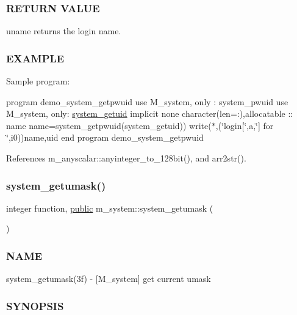 \subsubsection*{R\+E\+T\+U\+RN V\+A\+L\+UE}

uname returns the login name.

\subsubsection*{E\+X\+A\+M\+P\+LE}

Sample program\+:

program demo\+\_\+system\+\_\+getpwuid use M\+\_\+system, only \+: system\+\_\+pwuid use M\+\_\+system, only\+: \hyperlink{interfacem__system_1_1system__getuid}{system\+\_\+getuid} implicit none character(len=\+:),allocatable \+:\+: name name=system\+\_\+getpwuid(system\+\_\+getuid)) write($\ast$,\textquotesingle{}(\char`\"{}login\mbox{[}\char`\"{},a,\char`\"{}\mbox{]} for \char`\"{},i0)\textquotesingle{})name,uid end program demo\+\_\+system\+\_\+getpwuid 

References m\+\_\+anyscalar\+::anyinteger\+\_\+to\+\_\+128bit(), and arr2str().

\mbox{\label{namespacem__system_aa9ca951be39d2ea738d627cf42c00ddd}} 
\subsubsection{\texorpdfstring{system\+\_\+getumask()}{system\_getumask()}}
{\footnotesize\ttfamily integer function, \hyperlink{M__stopwatch_83_8txt_a2f74811300c361e53b430611a7d1769f}{public} m\+\_\+system\+::system\+\_\+getumask (\begin{DoxyParamCaption}{ }\end{DoxyParamCaption})}



\subsubsection*{N\+A\+ME}

system\+\_\+getumask(3f) -\/ \mbox{[}M\+\_\+system\mbox{]} get current umask \subsubsection*{S\+Y\+N\+O\+P\+S\+IS}

